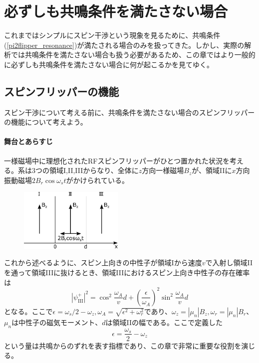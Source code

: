 \section{必ずしも共鳴条件を満たさない場合}\label{nonreso_sec}
これまではシンプルにスピン干渉という現象を見るために、共鳴条件(\ref{pi2flipper_resonance})が満たされる場合のみを扱ってきた。しかし、実際の解析では共鳴条件を満たさない場合も扱う必要があるため、この章ではより一般的に必ずしも共鳴条件を満たさない場合に何が起こるかを見てゆく。


\subsection{スピンフリッパーの機能}
スピン干渉について考える前に、共鳴条件を満たさない場合のスピンフリッパーの機能について考えよう。

\paragraph{舞台とあらすじ}
一様磁場中に理想化されたRFスピンフリッパーがひとつ置かれた状況を考える。系は3つの領域I,II,IIIからなり、全体に$z$方向一様磁場$B_z$が、領域IIに$x$方向振動磁場$2B_r \cos \omega_s t$がかけられている。
\begin{figure}[h]
\centering
\includegraphics[height=3cm]{nonreso/resonance_setting1.pdf}
\end{figure}

これから述べるように、スピン上向きの中性子が領域Iから速度$v$で入射し領域IIを通って領域IIIに抜けるとき、領域IIIにおけるスピン上向き中性子の存在確率は
\begin{equation}
|\psi_{\mathrm{III}}^+|^2=\cos^2 \frac{\omega_A}{v}d+\left(\frac{\epsilon}{\omega_A}\right)^2\sin^2\frac{\omega_A}{v}d \label{Nonreso_flip}
\end{equation}
となる。ここで$\epsilon=\omega_s/2-\omega_z,\omega_A=\sqrt{\epsilon^2+\omega_r^2}$であり、$\omega_z=|\mu_n|B_z,\omega_r=|\mu_n|B_r$、$\mu_n$は中性子の磁気モーメント、$d$は領域IIの幅である。ここで定義した
\begin{equation}
\epsilon=\frac{\omega_s}{2}-\omega_z
\end{equation}
という量は共鳴からのずれを表す指標であり、この章で非常に重要な役割を演じる。

